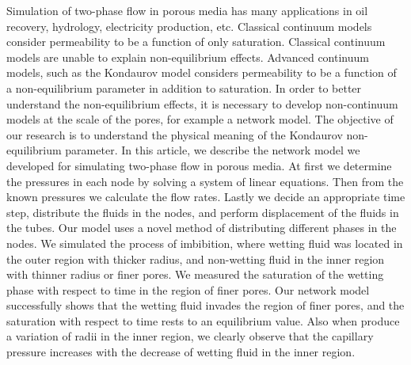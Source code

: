 Simulation of two-phase flow in porous media has many applications in oil recovery, hydrology, electricity production, etc. Classical continuum models consider permeability to be a function of only saturation. Classical continuum models are unable to explain non-equilibrium effects. Advanced continuum models, such as the Kondaurov model considers permeability to be a function of a non-equilibrium parameter in addition to saturation. In order to better understand the non-equilibrium effects, it is necessary to develop non-continuum models at the scale of the pores, for example a network model. The objective of our research is to understand the physical meaning of the Kondaurov non-equilibrium parameter. In this article, we describe the network model we developed for simulating two-phase flow in porous media. At first we determine the pressures in each node by solving a system of linear equations. Then from the known pressures we calculate the flow rates. Lastly we decide an appropriate time step, distribute the fluids in the nodes, and perform displacement of the fluids in the tubes. Our model uses a novel method of distributing different phases in the nodes. We simulated the process of imbibition, where wetting fluid was located in the outer region with thicker radius, and non-wetting fluid in the inner region with thinner radius or finer pores. We measured the saturation of the wetting phase with respect to time in the region of finer pores. Our network model successfully shows that the wetting fluid invades the region of finer pores, and the saturation with respect to time rests to an equilibrium value. Also when produce a variation of radii in the inner region, we clearly observe that the capillary pressure increases with the decrease of wetting fluid in the inner region. 
